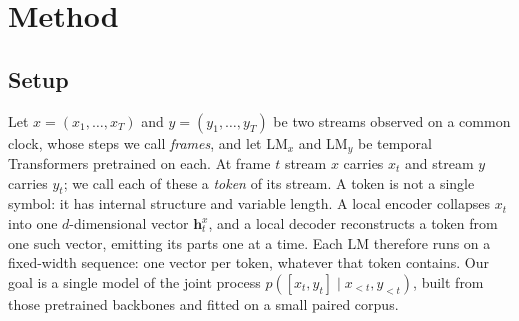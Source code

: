%
%
%
\section{Method}
\label{sec:method}

\subsection{Setup}
\label{sec:setup}

Let $x = (x_1, \dots, x_T)$ and $y = (y_1, \dots, y_T)$ be two streams
observed on a common clock, whose steps we call \emph{frames}, and let
$\mathrm{LM}_x$ and $\mathrm{LM}_y$ be temporal Transformers pretrained
on each. At frame $t$ stream $x$ carries $x_t$ and stream $y$ carries
$y_t$; we call each of these a \emph{token} of its stream. A token is
not a single symbol: it has internal structure and variable length. A
local encoder collapses $x_t$ into one $d$-dimensional vector
$\mathbf{h}^{x}_t$, and a local decoder reconstructs
a token from one such vector, emitting its parts one at a time. Each
$\mathrm{LM}$ therefore runs on a fixed-width sequence: one vector per
token, whatever that token contains. Our goal is a single model of
the joint process $p([x_t, y_t] \mid x_{<t}, y_{<t})$, built from those
pretrained backbones and fitted on a small paired corpus.

